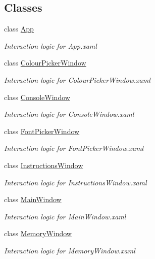\subsection*{Classes}
\begin{DoxyCompactItemize}
\item 
class \hyperlink{class_c_p_u___o_s___simulator_1_1_app}{App}
\begin{DoxyCompactList}\small\item\em Interaction logic for App.\+xaml \end{DoxyCompactList}\item 
class \hyperlink{class_c_p_u___o_s___simulator_1_1_colour_picker_window}{Colour\+Picker\+Window}
\begin{DoxyCompactList}\small\item\em Interaction logic for Colour\+Picker\+Window.\+xaml \end{DoxyCompactList}\item 
class \hyperlink{class_c_p_u___o_s___simulator_1_1_console_window}{Console\+Window}
\begin{DoxyCompactList}\small\item\em Interaction logic for Console\+Window.\+xaml \end{DoxyCompactList}\item 
class \hyperlink{class_c_p_u___o_s___simulator_1_1_font_picker_window}{Font\+Picker\+Window}
\begin{DoxyCompactList}\small\item\em Interaction logic for Font\+Picker\+Window.\+xaml \end{DoxyCompactList}\item 
class \hyperlink{class_c_p_u___o_s___simulator_1_1_instructions_window}{Instructions\+Window}
\begin{DoxyCompactList}\small\item\em Interaction logic for Instructions\+Window.\+xaml \end{DoxyCompactList}\item 
class \hyperlink{class_c_p_u___o_s___simulator_1_1_main_window}{Main\+Window}
\begin{DoxyCompactList}\small\item\em Interaction logic for Main\+Window.\+xaml \end{DoxyCompactList}\item 
class \hyperlink{class_c_p_u___o_s___simulator_1_1_memory_window}{Memory\+Window}
\begin{DoxyCompactList}\small\item\em Interaction logic for Memory\+Window.\+xaml \end{DoxyCompactList}\item 

\end{DoxyCompactItemize}

